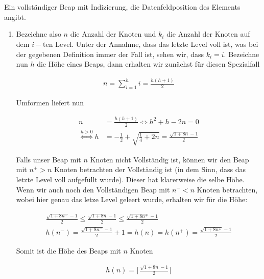 \begin{solution}
\phantom{}
\begin{center}
   \\
  \phantom{} \\
  Ein vollständiger Beap mit Indizierung, die Datenfeldposition des Elements angibt.
\end{center}



\begin{enumerate}[label = \alph*)]
  \item Bezeichne also $n$ die Anzahl der Knoten und $k_i$ die Anzahl der Knoten auf dem $i-$ten Level. Unter der Annahme, dass das letzte Level voll ist, was bei der gegebenen Definition immer der Fall ist, sehen wir, dass $k_i = i$. Bezeichne nun $h$ die Höhe eines Beaps, dann erhalten wir zunächst für diesen Spezialfall

  \begin{align*}
    n
    =
    \sum_{i=1}^h i
    =
    \frac{h(h+1)}{2}
  \end{align*}

  Umformen liefert nun

  \begin{align*}
    n
    &=
    \frac{h(h+1)}{2}
    \iff
    h^2 + h - 2n = 0 \\
    \stackrel{h > 0}{\iff}
    h &= -\frac{1}{2} + \sqrt{\frac{1}{4} + 2n}
    = \frac{\sqrt{1 + 8n} - 1}{2}
  \end{align*}

	Falls unser Beap mit $n$ Knoten nicht Vollständig ist, können wir den Beap mit $n^+ > n$ Knoten betrachten der Vollständig ist (in dem Sinn, dass das letzte Level voll aufgefüllt wurde). Dieser hat klarerweise die selbe Höhe. Wenn wir auch noch den Vollständigen Beap mit $n^- < n$ Knoten betrachten, wobei hier genau das letze Level geleert wurde, erhalten wir für die Höhe:
	
	\begin{align*}
	 \frac{\sqrt{1 + 8n^-} - 1}{2}
	 \leq
	 \frac{\sqrt{1 + 8n} - 1}{2}
	 \leq
	 \frac{\sqrt{1 + 8n^+} - 1}{2} \\
	  h(n^-) = \frac{\sqrt{1 + 8n^-} - 1}{2} + 1
	  =
	  h(n)
	  =
	  h(n^+) = \frac{\sqrt{1 + 8n^+} - 1}{2}
	\end{align*}
	
	Somit ist die Höhe des Beaps mit $n$ Knoten
	
	\begin{align*}
	  h(n)
	  =
	  \Big\lceil \frac{\sqrt{1 + 8n} - 1}{2}\Big\rceil
	\end{align*}
	

\end{enumerate}
\end{solution}
